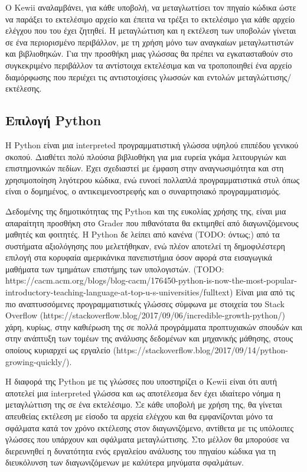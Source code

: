 \documentclass[diploma]{softlab-thesis}
\begin{document}
\bigskip

Ο Kewii αναλαμβάνει, για κάθε υποβολή, να μεταγλωττίσει τον πηγαίο κώδικα ώστε
να παράξει το εκτελέσιμο αρχείο και έπειτα να τρέξει το εκτελέσιμο για κάθε
αρχείο ελέγχου που του έχει ζητηθεί. Η μεταγλώττιση και η εκτέλεση των υποβολών
γίνεται σε ένα περιορισμένο περιβάλλον, με τη χρήση μόνο των αναγκαίων
μεταγλωττιστών και βιβλιοθηκών. Για την προσθήκη μιας γλώσσας θα πρέπει να
εγκατασταθούν στο συγκεκριμένο περιβάλλον τα αντίστοιχα εκτελέσιμα και να
τροποποιηθεί ένα αρχείο διαμόρφωσης που περιέχει τις αντιστοιχίσεις γλωσσών
και εντολών μεταγλώττισης/εκτέλεσης.

\subsection{Επιλογή Python}

Η Python είναι μια interpreted προγραμματιστική γλώσσα υψηλού επιπέδου
γενικού σκοπού. Διαθέτει πολύ πλούσια βιβλιοθήκη για μια ευρεία γκάμα
λειτουργιών και επιστημονικών πεδίων. Έχει σχεδιαστεί με έμφαση στην
αναγνωσιμότητα και στη χρησιμοποίηση λιγότερου κώδικα, ενώ ευνοεί πολλαπλά
προγραμματιστικά στυλ όπως είναι ο δομημένος, ο αντικειμενοστρεφής και ο συναρτησιακό προγραμματισμός.

\bigskip

Δεδομένης της δημοτικότητας της Python και της ευκολίας χρήσης της, είναι μια
απαραίτητη προσθήκη στο Grader που πιθανότατα θα εκτιμηθεί από διαγωνιζόμενους
μαθητές και φοιτητές. Η Python δε λείπει από κανένα (TODO: όντως;) από τα
συστήματα αξιολόγησης που μελετήθηκαν, ενώ πλέον αποτελεί τη δημοφιλέστερη
επιλογή στα κορυφαία αμερικάνικα πανεπιστήμια όσον αφορά στα εισαγωγικά μαθήματα
των τμημάτων επιστήμης των υπολογιστών. (TODO: https://cacm.acm.org/blogs/blog-cacm/176450-python-is-now-the-most-popular-introductory-teaching-language-at-top-u-s-universities/fulltext)
Είναι μια από τις πιο αναπτυσσόμενες προγραμματιστικές γλώσσες σύμφωνα με στοιχεία του
Stack Overflow (https://stackoverflow.blog/2017/09/06/incredible-growth-python/)
χάρη, κυρίως, στην καθιέρωση της σε πολλά προγράμματα προπτυχιακών σπουδών και
στην ανάπτυξη των τομέων της ανάλυσης δεδομένων και μηχανικής μάθησης, στους
οποίους κυριαρχεί ως εργαλείο (https://stackoverflow.blog/2017/09/14/python-growing-quickly/).

\bigskip

Η διαφορά της Python με τις γλώσσες που υποστηρίζει ο Kewii είναι ότι αυτή
αποτελεί μια interpreted γλώσσα και ως αποτέλεσμα δεν έχει ιδιαίτερο νόημα η
μεταγλώττιση της σε ένα εκτελέσιμο. Σε κάθε υποβολή με χρήση της, θα γίνεται
απευθείας εκτέλεση με είσοδο τα αρχεία ελέγχου και θα εμφανίζονται μόνο τα
σφάλματα κατά τον χρόνο εκτέλεσης στον διαγωνιζόμενο, αντίθετα με τις υπόλοιπες
γλώσσες που υπάρχουν και σφάλματα μεταγλώττισης. Στο μέλλον θα μπορούσε να
διερευνηθεί η δυνατότητα ενός εργαλείου ανάλυσης του πηγαίου κώδικα για τη
διευκόλυνση των διαγωνιζόμενων με καλύτερα μηνύματα σφαλμάτων.
\end{document}
